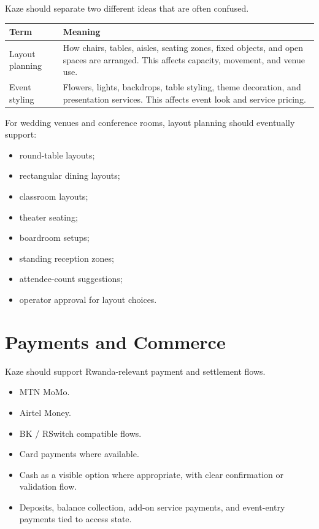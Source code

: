\documentclass[11pt,a4paper]{article}
\begin{document}
Kaze should separate two different ideas that are often confused.

\begin{longtable}{p{} p{}}
\textbf{Term} & \textbf{Meaning} \\
\midrule
Layout planning & How chairs, tables, aisles, seating zones, fixed objects, and open spaces are arranged. This affects capacity, movement, and venue use. \\
Event styling & Flowers, lights, backdrops, table styling, theme decoration, and presentation services. This affects event look and service pricing. \\
\end{longtable}

For wedding venues and conference rooms, layout planning should eventually support:

\begin{itemize}
    \item round-table layouts;
    \item rectangular dining layouts;
    \item classroom layouts;
    \item theater seating;
    \item boardroom setups;
    \item standing reception zones;
    \item attendee-count suggestions;
    \item operator approval for layout choices.
\end{itemize}

\section{Payments and Commerce}

Kaze should support Rwanda-relevant payment and settlement flows.

\begin{itemize}
    \item MTN MoMo.
    \item Airtel Money.
    \item BK / RSwitch compatible flows.
    \item Card payments where available.
    \item Cash as a visible option where appropriate, with clear confirmation or validation flow.
    \item Deposits, balance collection, add-on service payments, and event-entry payments tied to access state.
\end{itemize}
\end{document}
